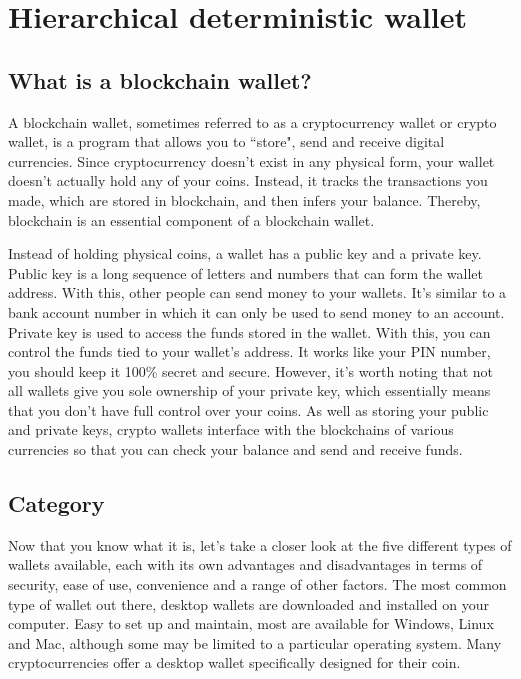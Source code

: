 \section{Hierarchical deterministic wallet}
\label{Hierarchical deterministic wallet}

\subsection{What is a blockchain wallet?}

A blockchain wallet, sometimes referred to as a cryptocurrency wallet or crypto wallet, is a program that allows you to ``store", send and receive digital currencies. Since cryptocurrency doesn’t exist in any physical form, your wallet doesn't actually hold any of your coins. Instead, it tracks the transactions you made, which are stored in blockchain, and then infers your balance. Thereby, blockchain is an essential component of a blockchain wallet.

Instead of holding physical coins, a wallet has a public key and a private key. Public key is a long sequence of letters and numbers that can form the wallet address. With this, other people can send money to your wallets. It’s similar to a bank account number in which it can only be used to send money to an account. Private key is used to access the funds stored in the wallet. With this, you can control the funds tied to your wallet’s address. It works like your PIN number, you should keep it 100\% secret and secure. However, it’s worth noting that not all wallets give you sole ownership of your private key, which essentially means that you don’t have full control over your coins. As well as storing your public and private keys, crypto wallets interface with the blockchains of various currencies so that you can check your balance and send and receive funds.

\subsection{Category}

Now that you know what it is, let’s take a closer look at the five different types of wallets available, each with its own advantages and disadvantages in terms of security, ease of use, convenience and a range of other factors. The most common type of wallet out there, desktop wallets are downloaded and installed on your computer. Easy to set up and maintain, most are available for Windows, Linux and Mac, although some may be limited to a particular operating system. Many cryptocurrencies offer a desktop wallet specifically designed for their coin.

